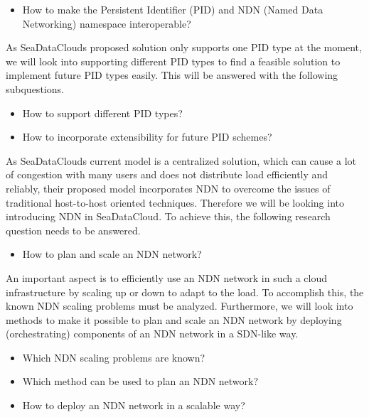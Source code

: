 \begin{itemize}
	\item How to make the Persistent Identifier (PID) and NDN (Named Data Networking) namespace interoperable?
\end{itemize}

As SeaDataClouds proposed solution only supports one PID type at the moment, we will look into supporting different PID types to find a feasible solution to implement future PID types easily. This will be answered with the following subquestions.
\begin{itemize}
    \begin{itemize}
	    \item How to support different PID types?
	    \item How to incorporate extensibility for future PID schemes?
	 \end{itemize}   
\end{itemize}

As SeaDataClouds current model is a centralized solution, which can cause a lot of congestion with many users and does not distribute load efficiently and reliably, their proposed model incorporates NDN to overcome the issues of traditional host-to-host oriented techniques. Therefore we will be looking into introducing NDN in SeaDataCloud. To achieve this, the following research question needs to be answered.   
\begin{itemize}
    \item How to plan and scale an NDN network?
\end{itemize}

An important aspect is to efficiently use an NDN network in such a cloud infrastructure by scaling up or down to adapt to the load. To accomplish this, 
the known NDN scaling problems must be analyzed. Furthermore, we will look into methods to make it possible to plan and scale an NDN network by deploying (orchestrating) components of an NDN network in a SDN-like way.
\begin{itemize}
    \begin{itemize}
	    \item Which NDN scaling problems are known?
	    \item Which method can be used to plan an NDN network?
	    \item How to deploy an NDN network in a scalable way?
	\end{itemize}
\end{itemize}


